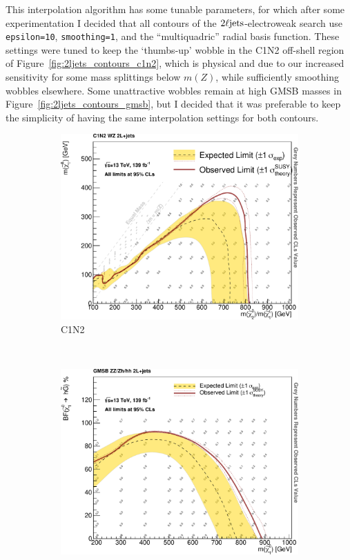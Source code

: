 This interpolation algorithm has some tunable parameters, for which after some
experimentation I decided that all contours of the $2\ell\mathrm{jets}$-electroweak
search use
\texttt{epsilon=10},
\texttt{smoothing=1},
and the ``multiquadric'' radial basis function.
These settings were tuned to keep the `thumbs-up' wobble in the C1N2 off-shell
region of Figure~\ref{fig:2ljets_contours_c1n2},
which is physical and due to our increased sensitivity for some mass splittings
below $m(Z)$,
while sufficiently smoothing wobbles elsewhere.
Some unattractive wobbles remain at high GMSB masses in
Figure~\ref{fig:2ljets_contours_gmsb}, but I decided that it was preferable to
keep the simplicity of having the same interpolation settings for both
contours.

\begin{figure}[tp]
\centering
\begin{subfigure}{0.7\textwidth}
\centering
\includegraphics[width=\textwidth]{figures/2ljets_c1n2_Output_Contours_cls_obs.pdf}
\caption{C1N2}
\end{subfigure}
\\
\begin{subfigure}{0.7\textwidth}
\centering
\includegraphics[width=\textwidth]{figures/2ljets_gmsb_Output_Contours_cls_obs.pdf}

\end{subfigure}
\end{figure}
